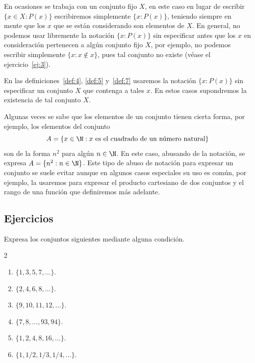 \documentclass[12pt,a4paper]{book}
\begin{document}
    En ocasiones se trabaja con un conjunto fijo $X$, en este caso en lugar
    de escribir $\{x\in X:P(x)\}$ escribiremos simplemente $\{x:P(x)\}$, teniendo
    siempre en mente que los $x$ que se están considerando son elementos de $X$. En
    general, no podemos usar libremente la notación $\{x:P(x)\}$ sin especificar
    antes que los $x$ en consideración pertenecen a algún conjunto fijo $X$, por
    ejemplo, no podemos escribir simplemente $\{x:x\notin x\}$, pues tal conjunto no
    existe (véase el ejercicio~\ref{ej:3}).

    En las definiciones~\ref{def:4}, \ref{def:5} y~\ref{def:7} usaremos la notación $\{x:P(x)\}$ sin especificar
    un conjunto $X$ que contenga a tales $x$. En estos casos supondremos la
    existencia de tal conjunto $X$.

    Algunas veces se sabe que los elementos de un conjunto tienen cierta forma,
    por ejemplo, los elementos del conjunto
    \begin{equation*}
        A=\{x\in\N:x\text{ es el cuadrado de un número natural}\}
    \end{equation*}
    son de la forma $n^{2}$ para algún $n\in\N$. En este caso, abusando de la notación,
    se expresa $A=\{n^{2}:n\in\N\}$. Este tipo de abuso de notación para expresar
    un conjunto se suele evitar aunque en algunos casos especiales su uso es
    común, por ejemplo, la usaremos para expresar el producto cartesiano de dos
    conjuntos y el rango de una función que definiremos más adelante.

    \par{}\subsection*{Ejercicios}

    \begin{ejercicio}\label{ej:2}
        Expresa los conjuntos siguientes mediante alguna condición.
        \begin{multicols}{2}
        \begin{enumerate}[nosep]
            \item $\{1,3,5,7,\ldots\}$.
            \item $\{2,4,6,8,\ldots\}$.
            \item $\{9,10,11,12,\ldots\}$.
            \item $\{7,8,\ldots,93,94\}$.
            \item $\{1,2,4,8,16,\ldots\}$.
            \item $\{1,1/2,1/3,1/4,\ldots\}$.
        \end{enumerate}
        \end{multicols}
    \end{ejercicio}
\end{document}
